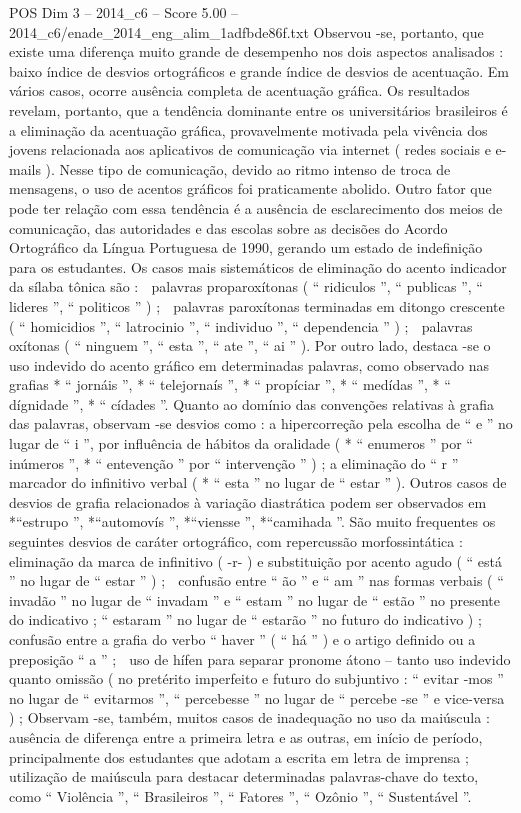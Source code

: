 \begin{textsample}{POS Dim 3 – 2014\_c6 – Score 5.00 – 2014\_c6/enade\_2014\_eng\_alim\_1adfbde86f.txt}
Observou -se, portanto, que existe uma diferença muito grande de desempenho nos dois aspectos analisados : baixo índice de desvios ortográficos e grande índice de desvios de acentuação.
Em vários casos, ocorre ausência completa de acentuação gráfica.
Os resultados revelam, portanto, que a tendência dominante entre os universitários brasileiros é a eliminação da acentuação gráfica, provavelmente motivada pela vivência dos jovens relacionada aos aplicativos de comunicação via internet ( redes sociais e e-mails ).
Nesse tipo de comunicação, devido ao ritmo intenso de troca de mensagens, o uso de acentos gráficos foi praticamente abolido.
Outro fator que pode ter relação com essa tendência é a ausência de esclarecimento dos meios de comunicação, das autoridades e das escolas sobre as decisões do Acordo Ortográfico da Língua Portuguesa de 1990, gerando um estado de indefinição para os estudantes.
Os casos mais sistemáticos de eliminação do acento indicador da sílaba tônica são :  palavras proparoxítonas ( “ ridiculos ”, “ publicas ”, “ lideres ”, “ politicos ” ) ;  palavras paroxítonas terminadas em ditongo crescente ( “ homicidios ”, “ latrocinio ”, “ individuo ”, “ dependencia ” ) ;  palavras oxítonas ( “ ninguem ”, “ esta ”, “ ate ”, “ ai ” ).
Por outro lado, destaca -se o uso indevido do acento gráfico em determinadas palavras, como observado nas grafias * “ jornáis ”, * “ telejornaís ”, * “ propíciar ”, * “ medídas ”, * “ dígnidade ”, * “ cídades ”.
Quanto ao domínio das convenções relativas à grafia das palavras, observam -se desvios como : a hipercorreção pela escolha de “ e ” no lugar de “ i ”, por influência de hábitos da oralidade ( * “ enumeros ” por “ inúmeros ”, * “ entevenção ” por “ intervenção ” ) ; a eliminação do “ r ” marcador do infinitivo verbal ( * “ esta ” no lugar de “ estar ” ).
Outros casos de desvios de grafia relacionados à variação diastrática podem ser observados em *“estrupo ”, *“automovís ”, *“viensse ”, *“camihada ”.
São muito frequentes os seguintes desvios de caráter ortográfico, com repercussão morfossintática :  eliminação da marca de infinitivo ( -r- ) e substituição por acento agudo ( “ está ” no lugar de “ estar ” ) ;  confusão entre “ ão ” e “ am ” nas formas verbais ( “ invadão ” no lugar de “ invadam ” e “ estam ” no lugar de “ estão ” no presente do indicativo ; “ estaram ” no lugar de “ estarão ” no futuro do indicativo ) ;  confusão entre a grafia do verbo “ haver ” ( “ há ” ) e o artigo definido ou a preposição “ a ” ;  uso de hífen para separar pronome átono – tanto uso indevido quanto omissão ( no pretérito imperfeito e futuro do subjuntivo : “ evitar -mos ” no lugar de “ evitarmos ”, “ percebesse ” no lugar de “ percebe -se ” e vice-versa ) ; Observam -se, também, muitos casos de inadequação no uso da maiúscula : ausência de diferença entre a primeira letra e as outras, em início de período, principalmente dos estudantes que adotam a escrita em letra de imprensa ; utilização de maiúscula para destacar determinadas palavras-chave do texto, como “ Violência ”, “ Brasileiros ”, “ Fatores ”, “ Ozônio ”, “ Sustentável ”.

\end{textsample}
